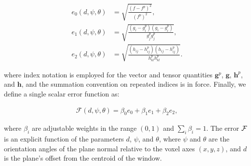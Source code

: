\begin{linenomath}\begin{align}
e_0(d,\psi,\theta) &=  \sqrt{\frac{(f - f^p)^2}{(f^p)^2}}, \\
e_1(d,\psi,\theta) &=  \sqrt{\frac{(g_i - g_i^p)(g_i - g_i^p)}{g_j^{p}g_j^{p}}}, \\
e_2(d,\psi,\theta) &=  \sqrt{\frac{(h_{ij} - h_{ij}^p)(h_{ij} - h_{ij}^p)}{h_{kl}^{p}h_{kl}^{p}}}.
\end{align}\end{linenomath}
{where index notation is employed for the vector and tensor quantities $\bm{g}^p$, $\bm{g}$, $\bm{h}^p$, and $\bm{h}$, and the summation convention on repeated indices is in force}. Finally, we define a single scalar error function as:
\begin{linenomath}\begin{align}
\label{obj func}
\mathcal{F}(d,\psi,\theta) = \beta_0e_0 + \beta_1e_1 + \beta_2e_2,
\end{align}\end{linenomath}
where $\beta_i$ are adjustable weights in the range $(0,1)$ and $\sum \limits_i\beta_i = 1$.  The error $\mathcal{F}$ is an explicit function of the parameters $d$, $\psi$, and $\theta$, where $\psi$ and $\theta$ are the orientation angles of the plane normal relative to the voxel axes $(x, y, z)$, and $d$ is the plane's offset from the centroid of the window.

